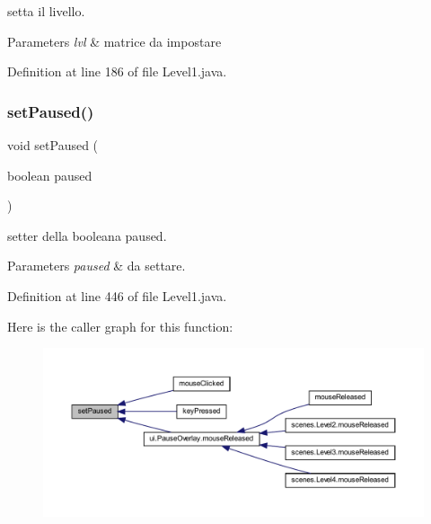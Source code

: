 setta il livello. 


\begin{DoxyParams}{Parameters}
{\em lvl} & matrice da impostare \\
\hline
\end{DoxyParams}


Definition at line 186 of file Level1.\+java.

\mbox{\label{classscenes_1_1_level1_aeab1551e3e372c6402076c04ea9002bb}} 
\subsubsection{\texorpdfstring{set\+Paused()}{setPaused()}}
{\footnotesize\ttfamily void set\+Paused (\begin{DoxyParamCaption}\item[{boolean}]{paused }\end{DoxyParamCaption})}



setter della booleana paused. 


\begin{DoxyParams}{Parameters}
{\em paused} & da settare. \\
\hline
\end{DoxyParams}


Definition at line 446 of file Level1.\+java.

Here is the caller graph for this function\+:\nopagebreak
\begin{figure}[H]
\begin{center}
\leavevmode
\includegraphics[width=350pt]{classscenes_1_1_level1_aeab1551e3e372c6402076c04ea9002bb_icgraph}
\end{center}
\end{figure}
\mbox{\label{classscenes_1_1_level1_ac9525f397417cae10d3de076f5b2e9d3}} 
